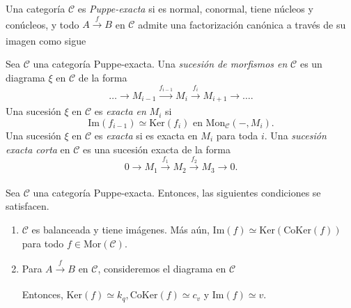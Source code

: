 \documentclass[tesis]{subfiles}
\begin{document}
\begin{Def}\label{Def: Categoría Puppe-exacta}
    Una categoría $\mathscr{C}$ es \emph{Puppe-exacta} si es normal, conormal, tiene núcleos y conúcleos, y todo $A\xrightarrow[]{f}B$ en $\mathscr{C}$ admite una factorización canónica a través de su imagen como sigue
    \begin{center}
    \end{center}
\end{Def}

\begin{Def}\label{Def: Sucesión exacta}
    Sea $\mathscr{C}$ una categoría Puppe-exacta. Una \emph{sucesión de morfismos en} $\mathscr{C}$ es un diagrama $\xi$ en $\mathscr{C}$ de la forma
    \[
    \dots \to M_{i-1}\xrightarrow[]{f_{i-1}} M_i\xrightarrow[]{f_i} M_{i+1} \to \dots .
    \] 
    Una sucesión $\xi$ en $\mathscr{C}$ es \emph{exacta en} $M_i$ si
    \[
        \text{Im}(f_{i-1})\simeq \text{Ker}(f_i) \text{ en } \text{Mon}_\mathscr{C}(-,M_i).
    \] 
    Una sucesión $\xi$ en $\mathscr{C}$ es \emph{exacta} si es exacta en $M_i$ para toda $i$. Una \emph{sucesión exacta corta} en $\mathscr{C}$ es una sucesión exacta de la forma
    \[
    0 \to M_1\xrightarrow[]{f_1} M_2\xrightarrow[]{f_2} M_3 \to 0.
    \] 
\end{Def}

\begin{Prop}\label{Mendoza-1.7.1}
    Sea $\mathscr{C}$ una categoría Puppe-exacta. Entonces, las siguientes condiciones se satisfacen.

    \begin{enumerate}[label=(\alph*)]
    
        \item $\mathscr{C}$ es balanceada y tiene imágenes. Más aún, $\text{Im}(f)\simeq\text{Ker}(\text{CoKer}(f))$ para todo $f\in\text{Mor}(\mathscr{C})$.

        \item Para $A\xrightarrow[]{f} B$ en $\mathscr{C}$, consideremos el diagrama en $\mathscr{C}$
            \begin{center}
            \end{center}
            Entonces, $\text{Ker}(f)\simeq k_q, \text{CoKer}(f)\simeq c_v$ y $\text{Im}(f)\simeq v$.
    \end{enumerate}
\end{Prop}
\end{document}
